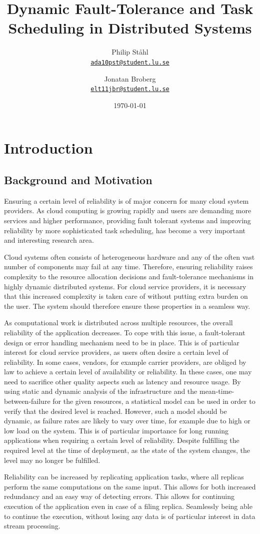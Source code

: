 \documentclass{cslthse-msc}
\author{
	Philip Ståhl \\
	{\normalsize \href{mailto:ada10pst@student.lu.se}{\texttt{ada10pst@student.lu.se}}}
	\and
	Jonatan Broberg \\
    {\normalsize \href{mailto:elt11jbr@student.lu.se
}{\texttt{elt11jbr@student.lu.se}}}
}
\title{Dynamic Fault-Tolerance and Task Scheduling in Distributed Systems}
\subtitle{}
\date{\today}
\begin{document}
\makefrontmatter

\chapter{Introduction} \label{ch:introduction} 
\section{Background and Motivation} 
Ensuring a certain level of reliability is of major concern for many cloud system providers. As cloud computing is growing rapidly and users are demanding more services and higher performance, providing fault tolerant systems and improving reliability by more sophisticated task scheduling, has become a very important and interesting research area. 

Cloud systems often consists of heterogeneous hardware and any of the often vast number of components may fail at any time. Therefore, ensuring reliability raises complexity to the resource allocation decisions and fault-tolerance mechanisms in highly dynamic distributed systems. For cloud service providers, it is necessary that this increased complexity is taken care of without putting extra burden on the user. The system should therefore ensure these properties in a seamless way.

As computational work is distributed across multiple resources, the overall reliability of the application decreases. To cope with this issue, a fault-tolerant design or error handling mechanism need to be in place. This is of particular interest for cloud service providers, as users often desire a certain level of reliability. In some cases, vendors, for example carrier providers, are obliged by law to achieve a certain level of availability or reliability. In these cases, one may need to sacrifice other quality aspects such as latency and resource usage. By using static and dynamic analysis of the infrastructure and the mean-time-between-failure for the given resources, a statistical model can be used in order to verify  that the desired level is reached. However, such a model should be dynamic, as failure rates are likely to vary over time, for example due to high or low load on the system. This is of particular importance for long running applications when requiring a certain level of reliability. Despite fulfilling the required level at the time of deployment, as the state of the system changes, the level may no longer be fulfilled.

Reliability can be increased by replicating application tasks, where all replicas perform the same computations on the same input. This allows for both increased redundancy and an easy way of detecting errors. This allows for continuing execution of the application even in case of a filing replica. Seamlessly being able to continue the execution, without losing any data is of particular interest in data stream processing.
\end{document}
